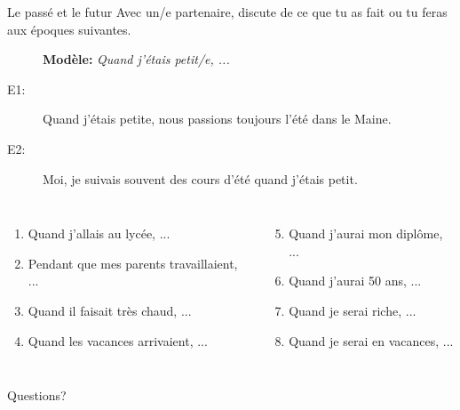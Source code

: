 \documentclass{beamer}
\begin{document}
  \begin{frame}{Le passé et le futur}
    Avec un/e partenaire, discute de ce que tu as fait ou tu feras aux époques suivantes.
    \begin{description}
      \item[] \textbf{Modèle:} \emph{Quand j'étais petit/e, ...}
      \item[E1:] Quand j'étais petite, nous passions toujours l'été dans le Maine.
      \item[E2:] Moi, je suivais souvent des cours d'été quand j'étais petit.
    \end{description}
    \begin{columns}[t]
        \begin{enumerate}
          \item Quand j'allais au lycée, ...
          \item Pendant que mes parents travaillaient, ...
          \item Quand il faisait très chaud, ...
          \item Quand les vacances arrivaient, ...
        \end{enumerate}
        \begin{enumerate}
          \setcounter{enumi}{4}
          \item Quand j'aurai mon diplôme, ...
          \item Quand j'aurai 50 ans, ...
          \item Quand je serai riche, ...
          \item Quand je serai en vacances, ...
        \end{enumerate}
    \end{columns}
  \end{frame}

  \begin{frame}{}
    \begin{center}
      \Large Questions?
    \end{center}
  \end{frame}
\end{document}
